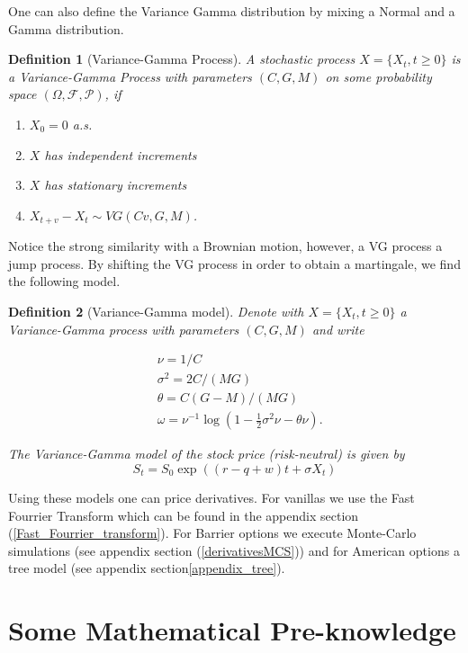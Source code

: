 \documentclass[12pt,a4paper,oneside]{book}
\newtheorem{Definition}{Definition}
\begin{document}
One can also define the Variance Gamma distribution by
mixing a Normal and a Gamma distribution. 

\begin{Definition}[Variance-Gamma Process]
A stochastic process $X = \{ X_t, t \geq 0 \}$ is a Variance-Gamma Process with parameters $(C,G,M)$ on some probability space $(\Omega,\mathcal{F}, \mathcal{P})$, if

\begin{enumerate}
    \item $X_0 = 0$ a.s.
    \item $X$ has independent increments
    \item $X$ has stationary increments
    \item $X_{t+v} - X_t \sim VG(Cv,G,M)$.
\end{enumerate}
\end{Definition}

Notice the strong similarity with a Brownian motion, however, a VG process a jump process. By shifting the VG process in order to obtain a martingale, we find the following model. 


\begin{Definition}[Variance-Gamma model]
Denote with $X = \{X_t, t \geq 0 \}$  a Variance-Gamma process with parameters $(C,G,M)$ and write  

\begin{align*}
&\nu = 1/C \\ 
&\sigma^2 = 2C/(MG) \\ 
&\theta = C(G-M)/(MG) \\
&\omega = \nu^{-1} \log(1- \frac{1}{2} \sigma^2 \nu  - \theta \nu).
\end{align*}

The Variance-Gamma model of the stock price (risk-neutral) is given by
\begin{equation}
S_t = S_0 \exp \left( \left(r-q+w \right) t + \sigma X_t \right)
\end{equation}
\end{Definition}

Using these models one can price derivatives. For vanillas we use the Fast Fourrier Transform which can be found in the appendix section (\ref{Fast_Fourrier_transform}). For Barrier options we execute Monte-Carlo simulations (see appendix section (\ref{derivativesMCS})) and for American options a tree model (see appendix section\ref{appendix_tree}).



\chapter{Some Mathematical Pre-knowledge} 
\end{document}
